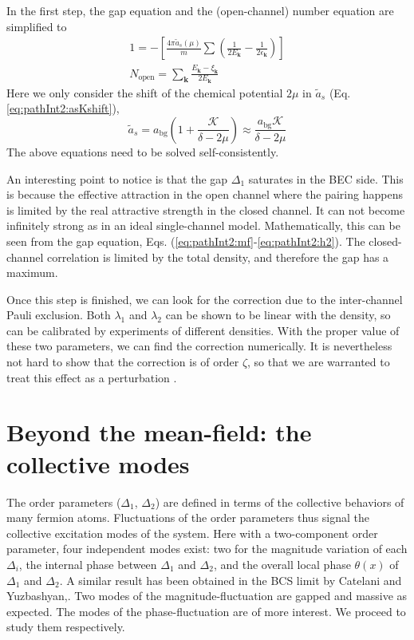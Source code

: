 \documentclass[reprint,pra]{revtex4-1}
\newcommand{\vk}{\ensuremath{\mathbf{k}}}
\newcommand{\nth}[1]{\ensuremath{\frac{1}{#1}}}
\newcommand{\mbr}[1]{\ensuremath{\left[#1\right]}}
\begin{document}
In  the first step, the gap equation and the (open-channel) number equation are simplified to 
\begin{gather}
1=-\mbr{\frac{4\pi{\tilde{a}_{s}(\mu)}}{m}\sum(\nth{2E_{\vk}}-\nth{2\epsilon_{\vk}})}\label{eq:pathInt2:narrowGapS}\\
N_{\text{open}}=\sum_\vk\frac{E_\vk-\xi_\vk}{2E_\vk}\label{eq:pathInt2:narrowNumS}
\end{gather}
Here we only consider the shift of the  chemical potential $2\mu$ in   $\tilde{a}_s$ (Eq. \ref{eq:pathInt2:asKshift}),
\begin{equation}
\tilde{a}_{s}=a_{\text{bg}}(1+\frac{\mathcal{K}}{\delta-2\mu})\approx{}\frac{a_{\text{bg}}\mathcal{K}}{\delta-2\mu}
\label{eq:pathInt2:simplenarrowAs}
\end{equation}
The above equations need to be solved self-consistently. 

 An interesting point  to notice is that the gap $\Delta_1$ saturates in the BEC side. This is because the effective attraction in the open channel where the pairing happens is limited by the real attractive strength in the closed channel.  It can not become  infinitely strong as in an ideal single-channel model.  Mathematically, this can be seen from the gap equation, Eqs. (\ref{eq:pathInt2:mf}-\ref{eq:pathInt2:h2}). The closed-channel correlation is limited by the total density, and therefore the gap has a maximum.  

Once this step is finished, we can look for the correction due to the inter-channel Pauli exclusion.  Both $\lambda_1$ and $\lambda_2$ can be shown  to be linear with the density, so can be calibrated by experiments of different densities.  With the proper value of these two parameters, we can find the correction numerically.  It is nevertheless not hard to show that the correction is of order $\zeta$, so that we are warranted to  treat this effect as a perturbation \cite{Zhuthesis}.


\section{Beyond the mean-field: the collective modes\label{sec:bosonic}}
The order parameters ($\Delta_{1}$, $\Delta_{2}$) are defined in terms of the collective behaviors of many fermion atoms.  Fluctuations of the order parameters thus signal the collective excitation modes of the system. Here with a two-component order parameter, four independent modes exist:   two for the magnitude variation of each $\Delta_i$, the internal phase between $\Delta_1$ and $\Delta_2$, and the overall local phase $\theta(x)$ of $\Delta_1$ and $\Delta_2$.  %
A similar result has been obtained in the BCS limit by Catelani and Yuzbashyan,\cite{Catelani}.
Two modes of the magnitude-fluctuation are gapped and massive as expected.  The modes of the phase-fluctuation are  of more interest.
We proceed to study them respectively.  
\end{document}
